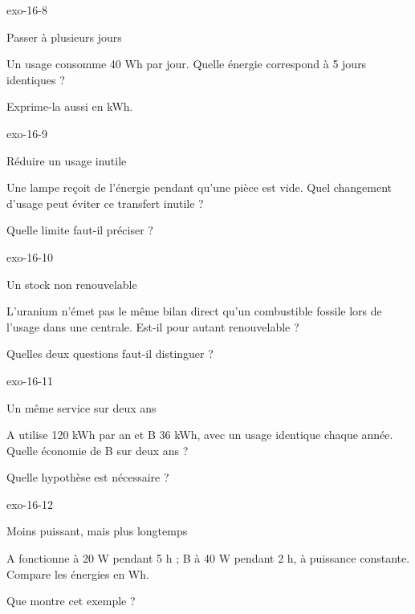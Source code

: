 \documentclass[12pt,twoside,openany]{book}
\begin{document}
\begin{blocLivre}{exo-16-8}
\begin{exercice}[2]{Passer à plusieurs jours}
\begin{questions}
\item Un usage consomme 40 Wh par jour. Quelle énergie correspond à 5 jours identiques ?
\item Exprime-la aussi en kWh.
\end{questions}
\end{exercice}\end{blocLivre}
\begin{blocLivre}{exo-16-9}
\begin{exercice}[2]{Réduire un usage inutile}
\begin{questions}
\item Une lampe reçoit de l’énergie pendant qu’une pièce est vide. Quel changement d’usage peut éviter ce transfert inutile ?
\item Quelle limite faut-il préciser ?
\end{questions}
\end{exercice}\end{blocLivre}
\begin{blocLivre}{exo-16-10}
\begin{exercice}[2]{Un stock non renouvelable}
\begin{questions}
\item L’uranium n’émet pas le même bilan direct qu’un combustible fossile lors de l’usage dans une centrale. Est-il pour autant renouvelable ?
\item Quelles deux questions faut-il distinguer ?
\end{questions}
\end{exercice}\end{blocLivre}
\begin{blocLivre}{exo-16-11}
\begin{exercice}[2]{Un même service sur deux ans}
\begin{questions}
\item A utilise 120 kWh par an et B 36 kWh, avec un usage identique chaque année. Quelle économie de B sur deux ans ?
\item Quelle hypothèse est nécessaire ?
\end{questions}
\end{exercice}\end{blocLivre}
\begin{blocLivre}{exo-16-12}
\begin{exercice}[3]{Moins puissant, mais plus longtemps}
\begin{questions}
\item A fonctionne à 20 W pendant 5 h ; B à 40 W pendant 2 h, à puissance constante. Compare les énergies en Wh.
\item Que montre cet exemple ?
\end{questions}
\end{exercice}\end{blocLivre}
\end{document}
